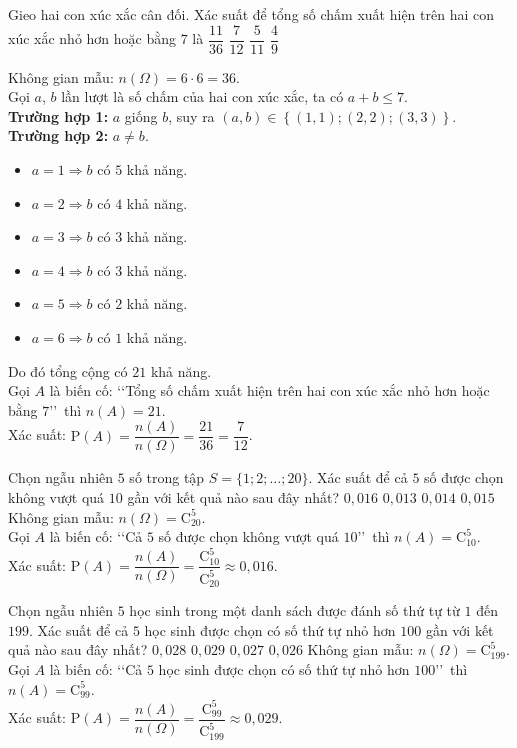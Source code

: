 \begin{ex}%
	Gieo hai con xúc xắc cân đối. Xác suất để tổng số chấm xuất hiện trên hai con xúc xắc nhỏ hơn hoặc bằng $7$ là
	\choice
	{$\dfrac{11}{36}$}
	{\True $\dfrac{7}{12}$}
	{$\dfrac{5}{11}$}
	{$\dfrac{4}{9}$}
	\loigiai
	{
		Không gian mẫu: $n(\Omega)=6\cdot 6=36$.\\
		Gọi $a$, $b$ lần lượt là số chấm của hai con xúc xắc, ta có $a+b\le 7$.\\
		\textbf{Trường hợp 1:} $a$ giống $b$, suy ra $(a,b)\in \left\{(1,1);(2,2);(3,3)\right\}$.\\
		\textbf{Trường hợp 2:} $a\ne b$.
		\begin{itemize}
			\item $a=1\Rightarrow b$ có $5$ khả năng.
			\item $a=2\Rightarrow b$ có $4$ khả năng.
			\item $a=3\Rightarrow b$ có $3$ khả năng.
			\item $a=4\Rightarrow b$ có $3$ khả năng.
			\item $a=5\Rightarrow b$ có $2$ khả năng.
			\item $a=6\Rightarrow b$ có $1$ khả năng.			
		\end{itemize}
		Do đó tổng cộng có $21$ khả năng.\\
		Gọi $A$ là biến cố: \lq\lq  Tổng số chấm xuất hiện trên hai con xúc xắc nhỏ hơn hoặc bằng $7$\rq\rq \, thì $n(A)=21$.\\
		Xác suất: $\mathrm{P}(A)=\dfrac{n(A)}{n(\Omega)} =\dfrac{21}{36}=\dfrac{7}{12}$.			
	}	
\end{ex}
\begin{ex}%
	Chọn ngẫu nhiên $5$ số trong tập $S=\{1 ; 2 ; \ldots ; 20\}$. Xác suất để cả $5$ số được chọn không vượt quá $10$ gần với kết quả nào sau đây nhất? 
	\choice
	{\True $0{,}016$}
	{$0{,}013$}
	{$0{,}014$}
	{$0{,}015$}
	\loigiai
	{
		Không gian mẫu: $n(\Omega)=\mathrm{C}^5_{20}$.\\
		Gọi $A$ là biến cố: \lq\lq  Cả $5$ số được chọn không vượt quá $10$\rq\rq \, thì $n(A)=\mathrm{C}^5_{10}$.\\
		Xác suất: $\mathrm{P}(A)=\dfrac{n(A)}{n(\Omega)} =\dfrac{\mathrm{C}^5_{10}}{\mathrm{C}^5_{20}}\approx 0{,}016$.			
	}	
\end{ex}
\begin{ex}%
	Chọn ngẫu nhiên $5$ học sinh trong một danh sách được đánh số thứ tự từ $1$ đến $199$. Xác suất để cả $5$ học sinh được chọn có số thứ tự nhỏ hơn $100$ gần với kết quả nào sau đây nhất?
	\choice
	{$0{,}028$}
	{\True $0{,}029$}
	{$0{,}027$}
	{$0{,}026$}
	\loigiai
	{
		Không gian mẫu: $n(\Omega)=\mathrm{C}^5_{199}$.\\
		Gọi $A$ là biến cố: \lq\lq  Cả $5$ học sinh được chọn có số thứ tự nhỏ hơn $100$\rq\rq \, thì $n(A)=\mathrm{C}^5_{99}$.\\
		Xác suất: $\mathrm{P}(A)=\dfrac{n(A)}{n(\Omega)} =\dfrac{\mathrm{C}^5_{99}}{\mathrm{C}^5_{199}}\approx 0{,}029$.		
	}	
\end{ex}
